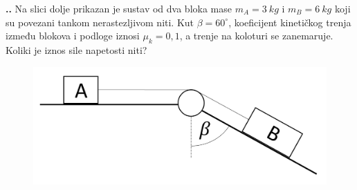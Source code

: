 
\noindent 
\textbf{
\thecjelina.\thezadatak.}
Na slici dolje prikazan je sustav od dva bloka mase $m_A=3\ kg$ i $m_B=6\ kg$ koji su povezani tankom nerastezljivom niti. Kut $\beta=60^\circ $, koeficijent kinetičkog trenja između blokova i podloge iznosi $\mu_k=0,1$, a trenje na koloturi se zanemaruje. Koliki je iznos sile napetosti niti?
\begin{figure}[ht]%
  \begin{center}
    \includegraphics[scale=0.20]{03_Dinamika_materijalne_tocke/zadatak_D735.png}
  \end{center}
\end{figure}

